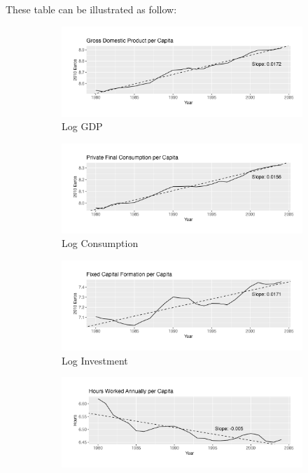 \documentclass[12pt]{article}
\begin{document}
These table can be illustrated as follow:

\begin{figure}
    \centering
    \begin{subfigure}[b]{0.45\textwidth}
      \includegraphics[width=\textwidth]{OUTPUT/MEDIA/loggdp_pc.png}
      \caption{Log GDP}
    \end{subfigure}
    \hfill
    \begin{subfigure}[b]{0.45\textwidth}
      \includegraphics[width=\textwidth]{OUTPUT/MEDIA/logcons_pc.png}
      \caption{Log Consumption}
    \end{subfigure}
    \vspace{\baselineskip} %
    \begin{subfigure}[b]{0.45\textwidth}
      \includegraphics[width=\textwidth]{OUTPUT/MEDIA/loginv_pc.png}
      \caption{Log Investment}
    \end{subfigure}
    \hfill
    \begin{subfigure}[b]{0.45\textwidth}
      \includegraphics[width=\textwidth]{OUTPUT/MEDIA/loghours_pc.png}

\end{subfigure}
\end{figure}
\end{document}
